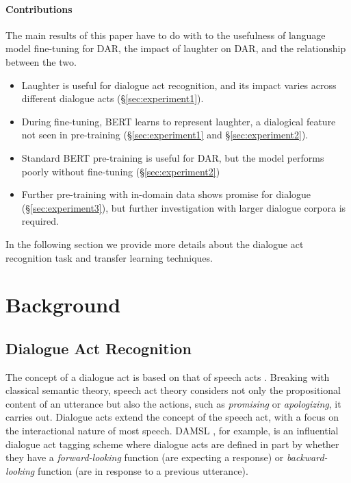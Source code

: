 \documentclass[11pt,a4paper]{article}
\begin{document}
\paragraph{Contributions}
The main results of this paper have to do with to the usefulness of language model fine-tuning for DAR, the impact of laughter on DAR, and the relationship between the two.
\begin{itemize}
  \item Laughter is useful for dialogue act recognition, and its impact varies across different dialogue acts (\S\ref{sec:experiment1}).
  \item During fine-tuning, BERT learns to represent laughter, a dialogical feature not seen in pre-training (\S\ref{sec:experiment1} and \S\ref{sec:experiment2}).
  \item Standard BERT pre-training is useful for DAR, but the model performs poorly without fine-tuning (\S\ref{sec:experiment2})
  \item Further pre-training with in-domain data shows promise for dialogue (\S\ref{sec:experiment3}), but further investigation with larger dialogue corpora is required.
  \end{itemize}

In the following section we provide more details about the dialogue act recognition task and transfer learning techniques. 


\section{Background}

\subsection{Dialogue Act Recognition}
The concept of a dialogue act is based on that of speech acts \citep{austinHowThingsWords2009}.
Breaking with classical semantic theory, speech act theory considers not only the propositional content of an utterance but also the actions, such as \emph{promising} or \emph{apologizing}, it carries out.
Dialogue acts extend the concept of the speech act, with a focus on the interactional nature of most speech.
DAMSL \citep{coreCodingDialogsDAMSL1997}, for example, is an influential dialogue act tagging scheme where dialogue acts are defined in part by whether they have a \emph{forward-looking} function (are expecting a response) or \emph{backward-looking} function (are in response to a previous utterance).
\end{document}
